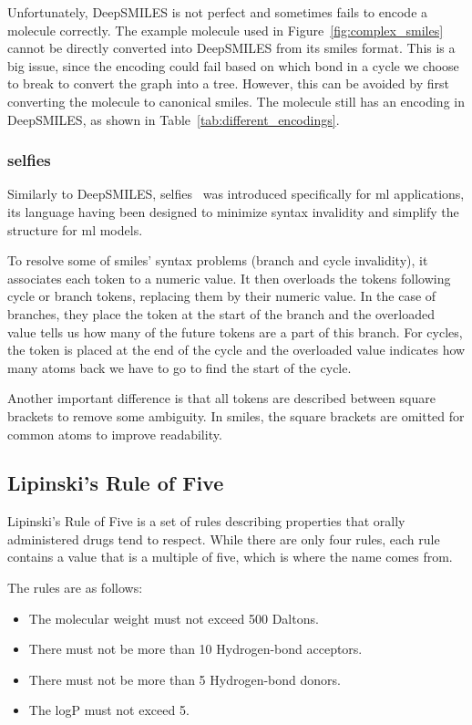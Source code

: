 \documentclass[../Document.tex]{subfiles}
\begin{document}
Unfortunately, DeepSMILES is not perfect and sometimes fails to encode a molecule correctly. The example molecule used in Figure~\ref{fig:complex_smiles} cannot be directly converted into DeepSMILES from its \gls{smiles} format. This is a big issue, since the encoding could fail based on which bond in a cycle we choose to break to convert the graph into a tree. However, this can be avoided by first converting the molecule to canonical \gls{smiles}. The molecule still has an encoding in DeepSMILES, as shown in Table~\ref{tab:different_encodings}.

\subsubsection{\acrshort{selfies}}
Similarly to DeepSMILES, \gls{selfies}~\cite{selfies_intro} was introduced specifically for \gls{ml} applications, its language having been designed to minimize syntax invalidity and simplify the structure for \gls{ml} models.

To resolve some of \gls{smiles}' syntax problems (\ie branch and cycle invalidity), it associates each token to a numeric value. It then overloads the tokens following cycle or branch tokens, replacing them by their numeric value. In the case of branches, they place the token at the start of the branch and the overloaded value tells us how many of the future tokens are a part of this branch. For cycles, the token is placed at the end of the cycle and the overloaded value indicates how many atoms back we have to go to find the start of the cycle.

Another important difference is that all tokens are described between square brackets to remove some ambiguity. In \gls{smiles}, the square brackets are omitted for common atoms to improve readability.


\subsection{Lipinski's Rule of Five}
\label{sec:lipinski-rules}
Lipinski's Rule of Five is a set of rules describing properties that orally administered drugs tend to respect. While there are only four rules, each rule contains a value that is a multiple of five, which is where the name comes from. 

The rules are as follows:
\begin{itemize}
    \item The molecular weight must not exceed 500 Daltons.
    \item There must not be more than 10 Hydrogen-bond acceptors.
    \item There must not be more than 5 Hydrogen-bond donors.
    \item The logP must not exceed 5.
\end{itemize}
\end{document}

